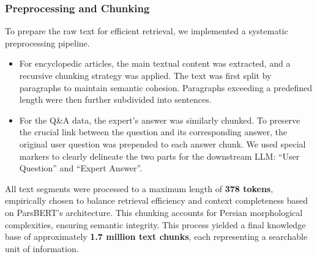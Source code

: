 \documentclass[11pt]{article}
\begin{document}
\subsubsection{Preprocessing and Chunking}

To prepare the raw text for efficient retrieval, we implemented a systematic preprocessing pipeline.

\begin{itemize}
    \item For encyclopedic articles, the main textual content was extracted, and a recursive chunking strategy was applied. The text was first split by paragraphs to maintain semantic cohesion. Paragraphs exceeding a predefined length were then further subdivided into sentences.
    \item For the Q\&A data, the expert's answer was similarly chunked. To preserve the crucial link between the question and its corresponding answer, the original user question was prepended to each answer chunk. We used special markers to clearly delineate the two parts for the downstream LLM: ``User Question'' and ``Expert Answer''.
\end{itemize}

All text segments were processed to a maximum length of \textbf{378 tokens}, empirically chosen to balance retrieval efficiency and context completeness based on ParsBERT's architecture. \cite{Farahani_2021} This chunking accounts for Persian morphological complexities, ensuring semantic integrity. This process yielded a final knowledge base of approximately \textbf{1.7 million text chunks}, each representing a searchable unit of information.
\end{document}
